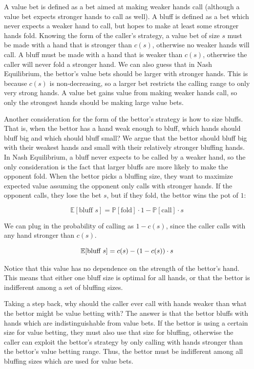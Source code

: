 \documentclass[a4paper,12pt]{article}
\theoremstyle{plain}
\theoremstyle{definition}
\begin{document}
A value bet is defined as a bet aimed at making weaker hands call (although a value bet expects stronger hands to call as well). A bluff is defined as a bet which never expects a weaker hand to call, but hopes to make at least some stronger hands fold. Knowing the form of the caller's strategy, a value bet of size $s$ must be made with a hand that is stronger than $c(s)$, otherwise no weaker hands will call. A bluff must be made with a hand that is weaker than $c(s)$, otherwise the caller will never fold a stronger hand. We can also guess that in Nash Equilibrium, the bettor's value bets should be larger with stronger hands. This is because $c(s)$ is non-decreasing, so a larger bet restricts the calling range to only very strong hands. A value bet gains value from making weaker hands call, so only the strongest hands should be making large value bets. 

Another consideration for the form of the bettor's strategy is how to size bluffs. That is, when the bettor has a hand weak enough to bluff, which hands should bluff big and which should bluff small? We argue that the bettor should bluff big with their weakest hands and small with their relatively stronger bluffing hands. In Nash Equilibrium, a bluff never expects to be called by a weaker hand, so the only consideration is the fact that larger bluffs are more likely to make the opponent fold. When the bettor picks a bluffing size, they want to maximize expected value assuming the opponent only calls with stronger hands. If the opponent calls, they lose the bet $s$, but if they fold, the bettor wins the pot of $1$:

\[ \mathbb{E}[\text{bluff } s] = \mathbb{P}[\text{fold}] \cdot 1 -\mathbb{P}[\text{call}] \cdot s \]

We can plug in the probability of calling as $1-c(s)$, since the caller calls with any hand stronger than $c(s)$.

\begin{equation}{\label{eq:bluff}}
    \mathbb{E}[\text{bluff } s] = c(s) - (1-c(s)) \cdot s
\end{equation}

Notice that this value has no dependence on the strength of the bettor's hand. This means that either one bluff size is optimal for all hands, or that the bettor is indifferent among a set of bluffing sizes. 

Taking a step back, why should the caller ever call with hands weaker than what the bettor might be value betting with? The answer is that the bettor bluffs with hands which are indistinguishable from value bets. If the bettor is using a certain size for value betting, they must also use that size for bluffing, otherwise the caller can exploit the bettor's strategy by only calling with hands stronger than the bettor's value betting range. Thus, the bettor must be indifferent among all bluffing sizes which are used for value bets.
\end{document}
